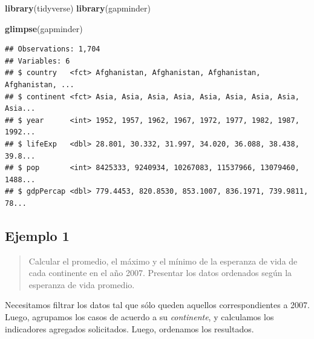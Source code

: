 \documentclass[]{book}
\newenvironment{Shaded}{\begin{snugshade}}{\end{snugshade}}
\newcommand{\DataTypeTok}[1]{\textcolor[rgb]{0.13,0.29,0.53}{#1}}
\newcommand{\DecValTok}[1]{\textcolor[rgb]{0.00,0.00,0.81}{#1}}
\newcommand{\KeywordTok}[1]{\textcolor[rgb]{0.13,0.29,0.53}{\textbf{#1}}}
\newcommand{\NormalTok}[1]{#1}
\newcommand{\OperatorTok}[1]{\textcolor[rgb]{0.81,0.36,0.00}{\textbf{#1}}}
\newcommand{\StringTok}[1]{\textcolor[rgb]{0.31,0.60,0.02}{#1}}
\begin{document}
\begin{Shaded}
\begin{Highlighting}[]
\KeywordTok{library}\NormalTok{(tidyverse)}
\KeywordTok{library}\NormalTok{(gapminder)}
\end{Highlighting}
\end{Shaded}

\begin{Shaded}
\begin{Highlighting}[]
\KeywordTok{glimpse}\NormalTok{(gapminder)}
\end{Highlighting}
\end{Shaded}

\begin{verbatim}
## Observations: 1,704
## Variables: 6
## $ country   <fct> Afghanistan, Afghanistan, Afghanistan, Afghanistan, ...
## $ continent <fct> Asia, Asia, Asia, Asia, Asia, Asia, Asia, Asia, Asia...
## $ year      <int> 1952, 1957, 1962, 1967, 1972, 1977, 1982, 1987, 1992...
## $ lifeExp   <dbl> 28.801, 30.332, 31.997, 34.020, 36.088, 38.438, 39.8...
## $ pop       <int> 8425333, 9240934, 10267083, 11537966, 13079460, 1488...
## $ gdpPercap <dbl> 779.4453, 820.8530, 853.1007, 836.1971, 739.9811, 78...
\end{verbatim}

\hypertarget{ejemplo-1}{%
\subsection{Ejemplo 1}\label{ejemplo-1}}

\begin{quote}
Calcular el promedio, el máximo y el mínimo de la esperanza de vida de cada continente en el año 2007. Presentar los datos ordenados según la esperanza de vida promedio.
\end{quote}

Necesitamos filtrar los datos tal que sólo queden aquellos correspondientes a 2007. Luego, agrupamos los casos de acuerdo a su \emph{continente}, y calculamos los indicadores agregados solicitados. Luego, ordenamos los resultados.

\begin{Shaded}
\end{Shaded}
\end{document}
